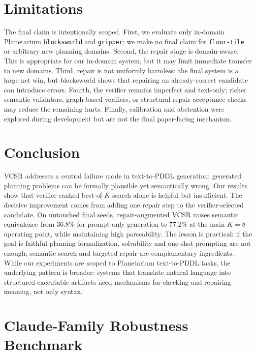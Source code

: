 \documentclass[11pt]{article}
\newcommand{\vcsr}{\textsc{VCSR}\xspace}
\newcommand{\pddl}{\textsc{PDDL}\xspace}
\begin{document}
\section{Limitations}

The final claim is intentionally scoped. First, we evaluate only in-domain
Planetarium \texttt{blocksworld} and \texttt{gripper}; we make no final claim
for \texttt{floor-tile} or arbitrary new planning domains. Second, the repair
stage is domain-aware. This is appropriate for our in-domain system, but it may
limit immediate transfer to new domains. Third, repair is not uniformly
harmless: the final system is a large net win, but blocksworld shows that
repairing an already-correct candidate can introduce errors. Fourth, the
verifier remains imperfect and text-only; richer semantic validators,
graph-based verifiers, or structural repair acceptance checks may reduce the
remaining hurts. Finally, calibration and abstention were explored during
development but are not the final paper-facing mechanism.

\section{Conclusion}

\vcsr addresses a central failure mode in text-to-\pddl generation: generated
planning problems can be formally plausible yet semantically wrong. Our results
show that verifier-ranked best-of-$K$ search alone is helpful but insufficient.
The decisive improvement comes from adding one repair step to the
verifier-selected candidate. On untouched final seeds, repair-augmented \vcsr
raises semantic equivalence from 36.8\% for prompt-only generation to 77.2\%
at the main $K=8$ operating point, while maintaining high parseability. The
lesson is practical: if the goal is faithful planning formalization,
solvability and one-shot prompting are not enough; semantic search and targeted
repair are complementary ingredients. While our experiments are scoped to
Planetarium text-to-\pddl tasks, the underlying pattern is broader: systems that
translate natural language into structured executable artifacts need mechanisms
for checking and repairing meaning, not only syntax.

\clearpage
\appendix

\section{Claude-Family Robustness Benchmark}
\end{document}
